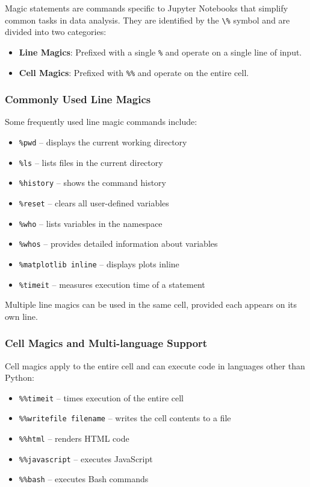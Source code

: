 \documentclass{article}
\begin{document}
Magic statements are commands specific to Jupyter Notebooks that simplify common tasks in data analysis. They are identified by the \texttt{\textbackslash\%} symbol and are divided into two categories:
\begin{itemize}
    \item \textbf{Line Magics}: Prefixed with a single \texttt{\%} and operate on a single line of input.
    \item \textbf{Cell Magics}: Prefixed with \texttt{\%\%} and operate on the entire cell.
\end{itemize}

\subsubsection{Commonly Used Line Magics}

Some frequently used line magic commands include:
\begin{itemize}
    \item \texttt{\%pwd} – displays the current working directory
    \item \texttt{\%ls} – lists files in the current directory
    \item \texttt{\%history} – shows the command history
    \item \texttt{\%reset} – clears all user-defined variables
    \item \texttt{\%who} – lists variables in the namespace
    \item \texttt{\%whos} – provides detailed information about variables
    \item \texttt{\%matplotlib inline} – displays plots inline
    \item \texttt{\%timeit} – measures execution time of a statement
\end{itemize}

Multiple line magics can be used in the same cell, provided each appears on its own line.

\subsubsection{Cell Magics and Multi-language Support}

Cell magics apply to the entire cell and can execute code in languages other than Python:
\begin{itemize}
    \item \texttt{\%\%timeit} – times execution of the entire cell
    \item \texttt{\%\%writefile filename} – writes the cell contents to a file
    \item \texttt{\%\%html} – renders HTML code
    \item \texttt{\%\%javascript} – executes JavaScript
    \item \texttt{\%\%bash} – executes Bash commands
\end{itemize}
\end{document}
